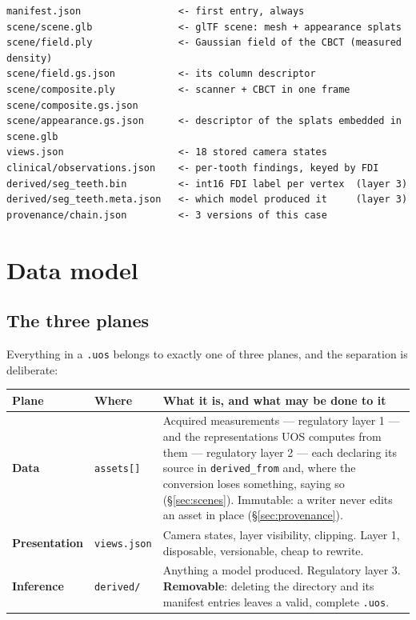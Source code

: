 \documentclass[11pt,a4paper]{article}
\newcommand{\code}[1]{\texttt{\small #1}}
\begin{document}
\begin{lstlisting}[style=plain, caption={Directory layout of the example container}]
manifest.json                 <- first entry, always
scene/scene.glb               <- glTF scene: mesh + appearance splats
scene/field.ply               <- Gaussian field of the CBCT (measured density)
scene/field.gs.json           <- its column descriptor
scene/composite.ply           <- scanner + CBCT in one frame
scene/composite.gs.json
scene/appearance.gs.json      <- descriptor of the splats embedded in scene.glb
views.json                    <- 18 stored camera states
clinical/observations.json    <- per-tooth findings, keyed by FDI
derived/seg_teeth.bin         <- int16 FDI label per vertex  (layer 3)
derived/seg_teeth.meta.json   <- which model produced it     (layer 3)
provenance/chain.json         <- 3 versions of this case
\end{lstlisting}

\section{Data model}\label{sec:model}

\subsection{The three planes}\label{sec:planes}

Everything in a \code{.uos} belongs to exactly one of three planes, and the separation is
deliberate:

\begin{longtable}{L{2.4cm} L{3.2cm} L{9.6cm}}
\toprule
\textbf{Plane} & \textbf{Where} & \textbf{What it is, and what may be done to it}\\
\midrule
\endhead
\textbf{Data} & \code{assets[]} & Acquired measurements --- regulatory layer 1 --- and
the representations UOS computes from them --- regulatory layer 2 --- each declaring its
source in \code{derived\_from} and, where the conversion loses something, saying so
(\S\ref{sec:scenes}). Immutable: a writer never edits an asset in place
(\S\ref{sec:provenance}).\\
\textbf{Presentation} & \code{views.json} & Camera states, layer visibility, clipping.
Layer 1, disposable, versionable, cheap to rewrite.\\
\textbf{Inference} & \code{derived/} & Anything a model produced. Regulatory layer 3.
\textbf{Removable}: deleting the directory and its manifest entries leaves a valid,
complete \code{.uos}.\\
\bottomrule
\end{longtable}
\end{document}
